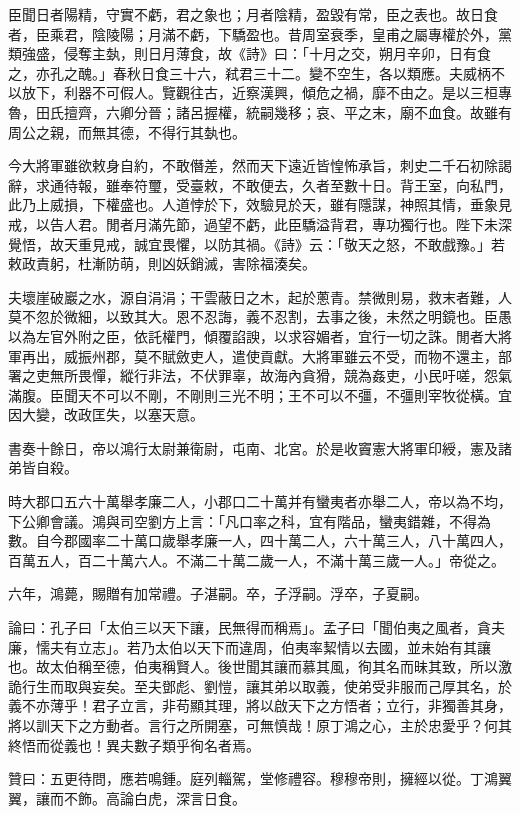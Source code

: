 \begin{pinyinscope}
臣聞日者陽精，守實不虧，君之象也；月者陰精，盈毀有常，臣之表也。故日食者，臣乘君，陰陵陽；月滿不虧，下驕盈也。昔周室衰季，皇甫之屬專權於外，黨類強盛，侵奪主埶，則日月薄食，故《詩》曰：「十月之交，朔月辛卯，日有食之，亦孔之醜。」春秋日食三十六，弒君三十二。變不空生，各以類應。夫威柄不以放下，利器不可假人。覽觀往古，近察漢興，傾危之禍，靡不由之。是以三桓專魯，田氏擅齊，六卿分晉；諸呂握權，統嗣幾移；哀、平之末，廟不血食。故雖有周公之親，而無其德，不得行其埶也。

今大將軍雖欲敕身自約，不敢僭差，然而天下遠近皆惶怖承旨，刺史二千石初除謁辭，求通待報，雖奉符璽，受臺敕，不敢便去，久者至數十日。背王室，向私門，此乃上威損，下權盛也。人道悖於下，效驗見於天，雖有隱謀，神照其情，垂象見戒，以告人君。閒者月滿先節，過望不虧，此臣驕溢背君，專功獨行也。陛下未深覺悟，故天重見戒，誠宜畏懼，以防其禍。《詩》云：「敬天之怒，不敢戲豫。」若敕政責躬，杜漸防萌，則凶妖銷滅，害除福湊矣。

夫壞崖破巖之水，源自涓涓；干雲蔽日之木，起於蔥青。禁微則易，救末者難，人莫不忽於微細，以致其大。恩不忍誨，義不忍割，去事之後，未然之明鏡也。臣愚以為左官外附之臣，依託權門，傾覆諂諛，以求容媚者，宜行一切之誅。閒者大將軍再出，威振州郡，莫不賦斂吏人，遣使貢獻。大將軍雖云不受，而物不還主，部署之吏無所畏憚，縱行非法，不伏罪辜，故海內貪猾，競為姦吏，小民吁嗟，怨氣滿腹。臣聞天不可以不剛，不剛則三光不明；王不可以不彊，不彊則宰牧從橫。宜因大變，改政匡失，以塞天意。

書奏十餘日，帝以鴻行太尉兼衛尉，屯南、北宮。於是收竇憲大將軍印綬，憲及諸弟皆自殺。

時大郡口五六十萬舉孝廉二人，小郡口二十萬并有蠻夷者亦舉二人，帝以為不均，下公卿會議。鴻與司空劉方上言：「凡口率之科，宜有階品，蠻夷錯雜，不得為數。自今郡國率二十萬口歲舉孝廉一人，四十萬二人，六十萬三人，八十萬四人，百萬五人，百二十萬六人。不滿二十萬二歲一人，不滿十萬三歲一人。」帝從之。

六年，鴻薨，賜贈有加常禮。子湛嗣。卒，子浮嗣。浮卒，子夏嗣。

論曰：孔子曰「太伯三以天下讓，民無得而稱焉」。孟子曰「聞伯夷之風者，貪夫廉，懦夫有立志」。若乃太伯以天下而違周，伯夷率絜情以去國，並未始有其讓也。故太伯稱至德，伯夷稱賢人。後世聞其讓而慕其風，徇其名而昧其致，所以激詭行生而取與妄矣。至夫鄧彪、劉愷，讓其弟以取義，使弟受非服而己厚其名，於義不亦薄乎！君子立言，非苟顯其理，將以啟天下之方悟者；立行，非獨善其身，將以訓天下之方動者。言行之所開塞，可無慎哉！原丁鴻之心，主於忠愛乎？何其終悟而從義也！異夫數子類乎徇名者焉。

贊曰：五更待問，應若鳴鍾。庭列輜駕，堂修禮容。穆穆帝則，擁經以從。丁鴻翼翼，讓而不飾。高論白虎，深言日食。


\end{pinyinscope}